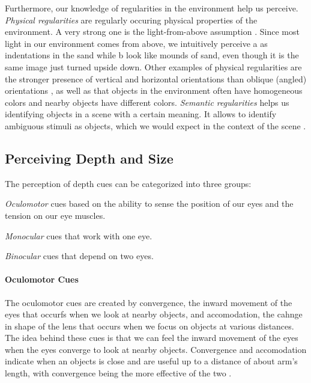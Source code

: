 Furthermore, our knowledge of regularities in the environment help us perceive.
\emph{Physical regularities} are regularly occuring physical properties of the environment. 
A very strong one is the light-from-above assumption \cite{Kleffner:1992:ShapeFromShading}.
Since most light in our environment comes from above, we intuitively perceive \II a as indentations in the sand while \II b look like mounds of sand, even though it is the same image just turned upside down.
Other examples of physical regularities are the stronger presence of vertical and horizontal orientations than oblique (angled) orientations \cite{Coppola:1998:UnequalRepresentations}, as well as that objects in the environment often have homogeneous colors and nearby objects have different colors.
\emph{Semantic regularities} helps us identifying objects in a scene with a certain meaning.
It allows to identify ambiguous stimuli as objects, which we would expect in the context of the scene \cite{Oliva:2007:RoleOfContext}.



\subsection{Perceiving Depth and Size}
The perception of depth cues can be categorized into three groups:
\begin{my_list_num}
	\item
		\emph{Oculomotor} cues based on the ability to sense the position of our eyes and the tension on our eye muscles.
	\item
		\emph{Monocular} cues that work with one eye.
	\item
		\emph{Binocular} cues that depend on two eyes.
\end{my_list_num}

\paragraph{Oculomotor Cues}
The oculomotor cues are created by convergence, the inward movement of the eyes that occurfs when we look at nearby objects, and accomodation, the cahnge in shape of the lens that occurs when we focus on objects at various distances.
The idea behind these cues is that we can feel the inward movement of the eyes when the eyes converge to look at nearby objects.
Convergence and accomodation indicate when an objects is close and are useful up to a distance of about arm's length, with convergence being the more effective of the two \cite{Mon-Williams:1999:ExtraretinalContribution, Tresilian:1999:Vergence}.

